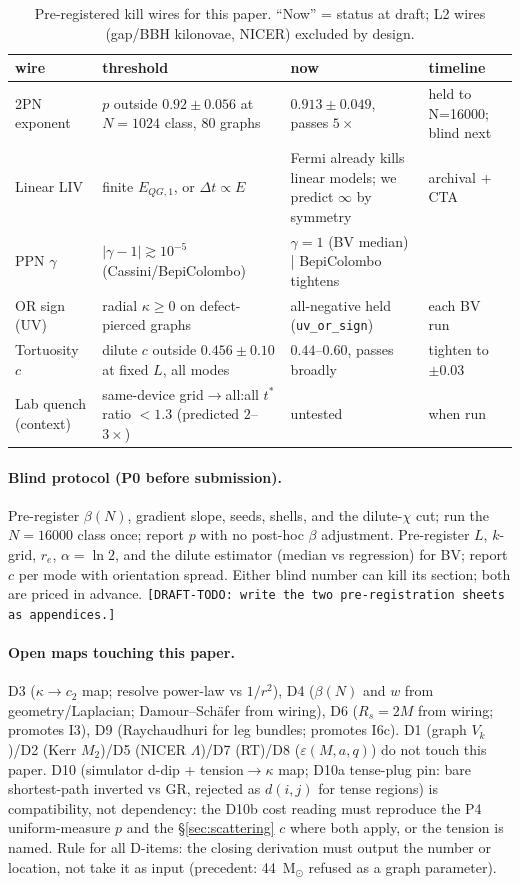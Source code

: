 \documentclass[11pt]{article}
\begin{document}
\begin{table}[ht]\centering\footnotesize
\caption{Pre-registered kill wires for this paper. ``Now'' = status at draft; L2 wires (gap/BBH kilonovae, NICER) excluded by design.}
\label{tab:kill}
\begin{tabular}{@{}l p{6.2cm} p{4.0cm} l@{}}\toprule
wire & threshold & now & timeline \\\midrule
2PN exponent & $p$ outside $0.92 \pm 0.056$ at $N = 1024$ class, 80 graphs & $0.913 \pm 0.049$, passes $5\times$ & held to N=16000; blind next \\
Linear LIV & finite $E_{QG,1}$, or $\Delta t \propto E$ & Fermi already kills linear models; we predict $\infty$ by symmetry & archival + CTA \\
PPN $\gamma$ & $|\gamma - 1| \gtrsim 10^{-5}$ (Cassini/BepiColombo) & $\gamma = 1$ (BV median) | BepiColombo tightens \\
OR sign (UV) & radial $\kappa \ge 0$ on defect-pierced graphs & all-negative held (\texttt{uv\_or\_sign}) & each BV run \\
Tortuosity $c$ & dilute $c$ outside $0.456 \pm 0.10$ at fixed $L$, all modes & $0.44$--$0.60$, passes broadly & tighten to $\pm 0.03$ \\
Lab quench (context) & same-device grid$\to$all:all $t^*$ ratio $< 1.3$ (predicted $2$--$3\times$) & untested & when run \\\bottomrule
\end{tabular}
\end{table}

\paragraph{Blind protocol (P0 before submission).} Pre-register $\beta(N)$, gradient slope, seeds, shells, and the dilute-$\chi$ cut; run the $N = 16000$ class once; report $p$ with no post-hoc $\beta$ adjustment. Pre-register $L$, $k$-grid, $r_e$, $\alpha = \ln 2$, and the dilute estimator (median vs regression) for BV; report $c$ per mode with orientation spread. Either blind number can kill its section; both are priced in advance. \texttt{[DRAFT-TODO: write the two pre-registration sheets as appendices.]}

\paragraph{Open maps touching this paper.} D3 ($\kappa \to c_2$ map; resolve power-law vs $1/r^2$), D4 ($\beta(N)$ and $w$ from geometry/Laplacian; Damour--Sch\"afer from wiring), D6 ($R_s = 2M$ from wiring; promotes I3), D9 (Raychaudhuri for leg bundles; promotes I6c). D1 (graph $V_k$)/D2 (Kerr $M_2$)/D5 (NICER $\Lambda$)/D7 (RT)/D8 ($\varepsilon(M,a,q)$) do not touch this paper. D10 (simulator d-dip + tension$\to\kappa$ map; D10a tense-plug pin: bare shortest-path inverted vs GR, rejected as $d(i,j)$ for tense regions) is compatibility, not dependency: the D10b cost reading must reproduce the P4 uniform-measure $p$ and the \S\ref{sec:scattering} $c$ where both apply, or the tension is named. Rule for all D-items: the closing derivation must output the number or location, not take it as input (precedent: 44~M$_{\odot}$ refused as a graph parameter).
\end{document}
